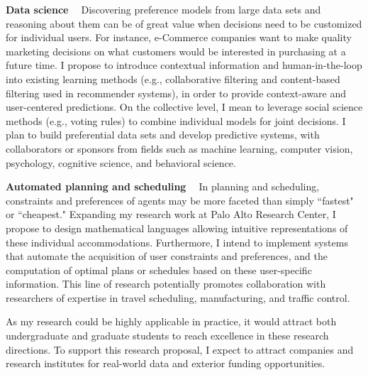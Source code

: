 \documentclass[11pt]{article}
\begin{document}
\smallskip \noindent \textbf{Data science \  } Discovering preference 
models from large data sets and reasoning about them 
can be of great value when decisions need to be customized for individual users.
For instance, e-Commerce companies want to make quality marketing decisions
on what customers would be interested in purchasing at a future time.
I propose to introduce contextual information and human-in-the-loop into existing learning methods
(e.g., collaborative filtering and content-based filtering used in recommender systems), 
in order to provide context-aware and user-centered predictions.
On the collective level, I mean to leverage social science methods (e.g., voting rules)
to combine individual models for joint decisions.
I plan to build preferential data sets and develop predictive systems, with collaborators
or sponsors from fields 
such as machine learning, computer vision, psychology, cognitive science, and behavioral science.

\smallskip \noindent \textbf{Automated planning and scheduling \  }
In planning and scheduling, constraints and preferences of agents may be more faceted than simply
``fastest" or ``cheapest."
Expanding my research work at Palo Alto Research Center,
I propose to design mathematical languages allowing
intuitive representations of these individual accommodations. 
Furthermore, I intend to implement systems
that automate the acquisition of user constraints and preferences, and the computation of optimal plans or schedules 
based on these user-specific information.
This line of research potentially promotes collaboration with researchers of expertise in
travel scheduling, manufacturing, and traffic control.

As my research could be highly applicable in practice, it would attract both undergraduate and graduate students to
reach excellence in these research directions.
To support this research proposal,
I expect to attract companies and research institutes
for real-world data and exterior funding opportunities.


{}
\end{document}
